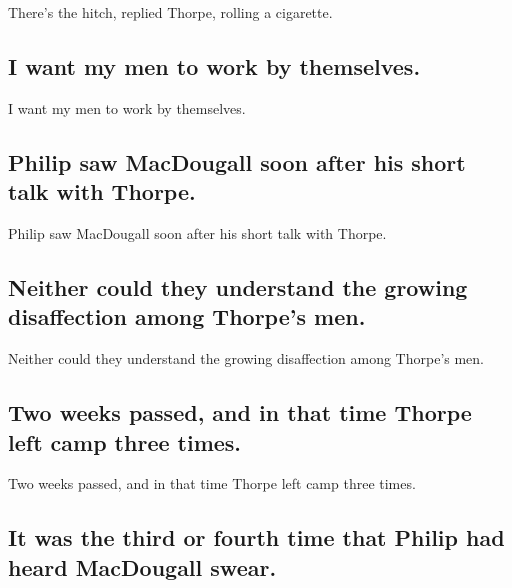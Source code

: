 \documentclass[]{article}
\begin{document}
There's the hitch, replied Thorpe, rolling a cigarette.

\hypertarget{i-want-my-men-to-work-by-themselves.}{%
\subsection{I want my men to work by
themselves.}\label{i-want-my-men-to-work-by-themselves.}}

I want my men to work by themselves.

\hypertarget{philip-saw-macdougall-soon-after-his-short-talk-with-thorpe.}{%
\subsection{Philip saw MacDougall soon after his short talk with
Thorpe.}\label{philip-saw-macdougall-soon-after-his-short-talk-with-thorpe.}}

Philip saw MacDougall soon after his short talk with Thorpe.

\hypertarget{neither-could-they-understand-the-growing-disaffection-among-thorpes-men.}{%
\subsection{Neither could they understand the growing disaffection among
Thorpe's
men.}\label{neither-could-they-understand-the-growing-disaffection-among-thorpes-men.}}

Neither could they understand the growing disaffection among Thorpe's
men.

\hypertarget{two-weeks-passed-and-in-that-time-thorpe-left-camp-three-times.}{%
\subsection{Two weeks passed, and in that time Thorpe left camp three
times.}\label{two-weeks-passed-and-in-that-time-thorpe-left-camp-three-times.}}

Two weeks passed, and in that time Thorpe left camp three times.

\hypertarget{it-was-the-third-or-fourth-time-that-philip-had-heard-macdougall-swear.}{%
\subsection{It was the third or fourth time that Philip had heard
MacDougall
swear.}\label{it-was-the-third-or-fourth-time-that-philip-had-heard-macdougall-swear.}}
\end{document}
